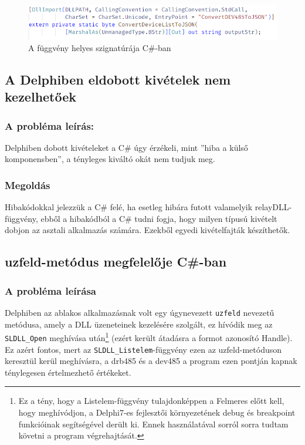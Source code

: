 \documentclass[tocnopagenum]{thesis-ekf}
\begin{document}
	\begin{figure}[h!]
		\centering
		\includegraphics[scale=0.8]{string_csharp}
		\caption{A függvény helyes szignatúrája C\#-ban}
		\label{string_csharp}
	\end{figure}

	\subsection{A Delphiben eldobott kivételek nem kezelhetőek}
	\subsubsection{A probléma leírás:} Delphiben dobott kivételeket a C\# úgy érzékeli, mint ''hiba a külső komponensben'', a tényleges kiváltó okát nem tudjuk meg.
	\subsubsection{Megoldás} Hibakódokkal jelezzük a C\# felé, ha esetleg hibára futott valamelyik relayDLL-függvény, ebből a hibakódból a C\# tudni fogja, hogy milyen típusú kivételt dobjon az asztali alkalmazás számára. Ezekből egyedi kivételfajták készíthetők.
	\subsection{uzfeld-metódus megfelelője C\#-ban}
	\subsubsection{A probléma leírása} Delphiben az ablakos alkalmazásnak volt egy úgynevezett \verb*|uzfeld| nevezetű metódusa, amely a DLL üzeneteinek kezelésére szolgált, ez hívódik meg az \verb*|SLDLL_Open| meghívása után\footnote{Ez a tény, hogy a Listelem-függvény tulajdonképpen a Felmeres előtt kell, hogy meghívódjon, a Delphi7-es fejlesztői környezetének debug és breakpoint funkcióinak segítségével derült ki. Ennek használatával sorról sorra tudtam követni a program végrehajtását.} (ezért került átadásra a formot azonosító Handle). Ez azért fontos, mert az \verb*|SLDLL_Listelem|-függvény ezen az uzfeld-metóduson keresztül kerül meghívásra, a drb485 és a dev485 a program ezen pontján kapnak ténylegesen értelmezhető értékeket.
\end{document}
